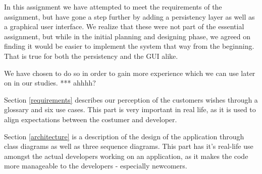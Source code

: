 In this assignment we have attempted to meet the requirements of the assignment, but have gone a step further by adding a persistency layer as well as a graphical user interface. We realize that these were not part of the essential assignment, but while in the initial planning and designing phase, we agreed on finding it would be easier to implement the system that way from the beginning. That is true for both the persistency and the GUI alike.

We have chosen to do so in order to gain more experience which we can use later on in our studies. *** ahhhh?

Section \ref{requirements} describes our perception of the customers wishes through a glossary and six use cases. This part is very important in real life, as it is used to align expectations between the costumer and developer.

Section \ref{architecture} is a description of the design of the application through class diagrams as well as three sequence diagrams. This part has it's real-life use amongst the actual developers working on an application, as it makes the code more manageable to the developers - especially newcomers.